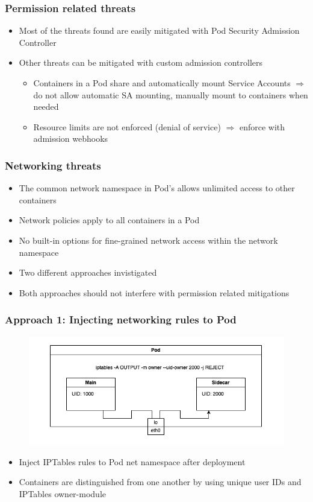 \documentclass{beamer}
\begin{document}
\begin{frame}
\frametitle{Permission related threats}

\begin{itemize}
  \item Most of the threats found are easily mitigated with Pod Security Admission Controller
  \item Other threats can be mitigated with custom admission controllers
  \begin{itemize}
    \item Containers in a Pod share and automatically mount Service Accounts $\Rightarrow$ do not allow automatic SA mounting, manually mount to containers when needed
    \item Resource limits are not enforced (denial of service) $\Rightarrow$ enforce with admission webhooks
  \end{itemize}
\end{itemize}
\end{frame}

\begin{frame}
\frametitle{Networking threats}

\begin{itemize}
  \item The common network namespace in Pod's allows unlimited access to other containers
  \item Network policies apply to all containers in a Pod
  \item No built-in options for fine-grained network access within the network namespace
  \item Two different approaches invistigated
  \item Both approaches should not interfere with permission related mitigations
\end{itemize}
\end{frame}

\begin{frame}
\frametitle{Approach 1: Injecting networking rules to Pod}

\begin{figure}[h!]
  \centering
  \includegraphics[width=\linewidth]{../thesis/files/iptables.png}
\end{figure}

\begin{itemize}
  \item Inject IPTables rules to Pod net namespace after deployment
  \item Containers are distinguished from one another by using unique user IDs and IPTables owner-module
\end{itemize}
\end{frame}
\end{document}

